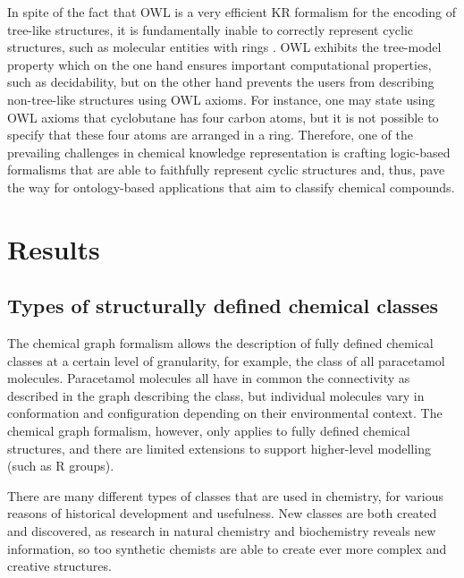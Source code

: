 \documentclass[10pt]{bmc_article}
\newenvironment{bmcformat}{\baselineskip20pt\sloppy\setboolean{publ}{false}}{\baselineskip20pt\sloppy}
\begin{document}
\begin{bmcformat}
In spite of the fact that OWL is a very efficient KR formalism for the encoding of tree-like structures, it is fundamentally inable to correctly represent cyclic structures, such as molecular entities with rings \cite{magka2010}. OWL exhibits the tree-model property \cite{VardiModalLogic} which on the one hand ensures important computational properties, such as decidability, but on the other hand prevents the users from describing  non-tree-like structures using OWL axioms. For instance, one may state using OWL axioms that cyclobutane has four carbon atoms, but it is not possible to specify that these four atoms are arranged in a ring. Therefore, one of the prevailing challenges in chemical knowledge representation is crafting logic-based formalisms that are able to faithfully represent cyclic structures and, thus, pave the way for ontology-based applications that aim to classify chemical compounds.

 


\section*{Results}

\subsection*{Types of structurally defined chemical classes}
\label{sec:resultsclasses}

The chemical graph formalism \cite{trinajstic1992} allows the description of fully defined chemical classes at a certain level of granularity, for example, the class of all paracetamol molecules.  Paracetamol molecules all have in common the connectivity as described in the graph describing the class, but individual molecules vary in conformation and configuration depending on their environmental context. The chemical graph formalism, however, only applies to fully defined chemical structures, and there are limited extensions to support higher-level modelling (such as R groups). 

There are many different types of classes that are used in chemistry, for various reasons of historical development and usefulness. New classes are both created and discovered, as research in natural chemistry and biochemistry reveals new information, so too synthetic chemists are able to create ever more complex and creative structures.


\end{bmcformat}
\end{document}
